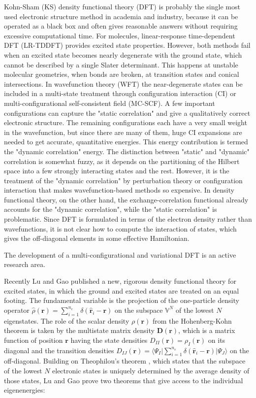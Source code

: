 \documentclass[journal=jacsat,manuscript=article]{achemso}
\newcommand\m[1]{\mathbf{#1}}
\renewcommand\vec[1]{\mathbf{#1}}
\begin{document}
Kohn-Sham (KS) density functional theory (DFT) is probably the single most used electronic structure
method in academia and industry, because it can be operated as a black box and often gives
reasonable answers without requiring excessive computational time.
For molecules, linear-response time-dependent DFT (LR-TDDFT) provides excited state properties.
However, both methods fail when an excited state becomes nearly degenerate with the ground state,
which cannot be described by a single Slater determinant. This happens at unstable molecular
geometries, when bonds are broken, at transition states and conical intersections.
In wavefunction theory (WFT) the near-degenerate states can be included in a multi-state treatment
through configuration interaction (CI) or multi-configurational self-consistent field (MC-SCF).
A few important configurations can capture the "static correlation" and give a qualitatively correct
electronic structure. The remaining configurations each have a very small weight in the wavefunction,
but since there are many of them, huge CI expansions are needed to get accurate, quantitative energies.
This energy contribution is termed the "dynamic correlation" energy.
The distinction between "static" and "dynamic" correlation is somewhat fuzzy, as it depends on the partitioning
of the Hilbert space into a few strongly interacting states and the rest. However, it is the treatment of the
"dynamic correlation" by perturbation theory or configuration interaction
that makes wavefunction-based methods so expensive. In density functional theory, on the other hand, the exchange-correlation
functional already accounts for the "dynamic correlation", while the "static correlation" is problematic.
Since DFT is formulated in terms of the electron density rather than wavefunctions, it is not clear how to compute
the interaction of states, which gives the off-diagonal elements in some effective Hamiltonian.

The development of a multi-configurational and variational DFT is an active research area.

% 

Recently Lu and Gao \cite{Lu2022JPCL} published a new, rigorous density functional theory for excited states, in which the ground
and excited states are treated on an equal footing. The fundamental variable is the projection
of the one-particle density operator $\hat{\rho}(\vec{r}) = \sum_{i=1}^{n_e} \delta(\hat{\vec{r}}_i - \vec{r})$ on the subspace
$\mathbb{V}^N$ of the lowest $N$ eigenstates. The role of the scalar density $\rho(\vec{r})$
from the Hohenberg-Kohn theorem is taken by the multistate matrix density $\m{D}(\vec{r})$,
which is a matrix function of position $\vec{r}$
having the state densities $D_{II}(\vec{r}) = \rho_{I}(\vec{r})$ on its diagonal and the transition densities
$D_{IJ}(\vec{r}) = \langle \Psi_I \vert \sum_{i=1}^{n_e} \delta(\hat{\vec{r}}_i - \vec{r}) \vert \Psi_J \rangle$ on the off-diagonal.
Building on Theophilou's theorem \cite{Theophilou1979}, which states that the subspace of the lowest $N$ electronic states is uniquely
determined by the average density of those states, Lu and Gao prove two theorems that give access to the individual eigenenergies:
\end{document}
